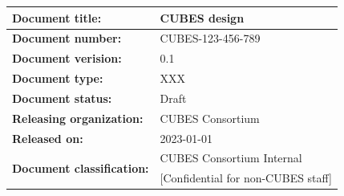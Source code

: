 \documentclass[12pt,a4paper]{report}
\begin{document}
\begin{center}
  \begin{tabular}{ l l }
    \hline
        {\bf Document title:}          & {\bf CUBES design}                       \\ \hline
        {\bf Document number:}         & CUBES-123-456-789                        \\ \hline
        {\bf Document verision:}       & 0.1                                      \\ \hline
        {\bf Document type:}           & XXX                                      \\ \hline
        {\bf Document status:}         & Draft                                    \\ \hline
        {\bf Releasing organization:}  & CUBES Consortium                         \\ \hline
        {\bf Released on:}             & 2023-01-01                               \\ \hline
        \multirow{2}{*}{\bf Document classification:} & CUBES Consortium Internal \\
                                       & [Confidential for non-CUBES staff]       \\ \hline
  \end{tabular}
\end{center}

\vfill
\end{document}
